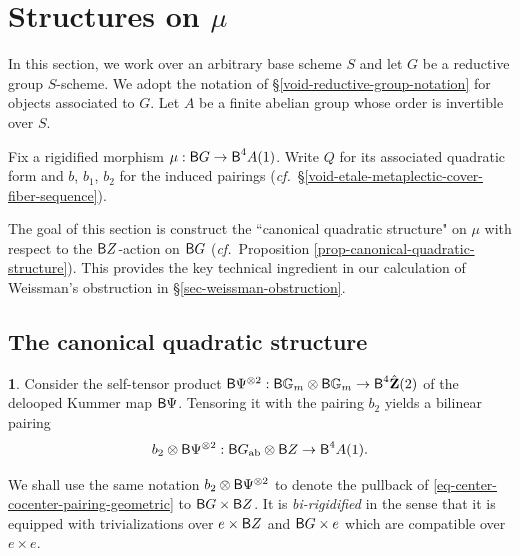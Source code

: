 \documentclass[10pt,english,reqno]{amsart}
\newcommand{\integers}{\mathbf Z}
\newcommand{\deloop}{\textnormal{\textsf{B}}}
\newcommand{\abelian}{\textnormal{ab}}
\theoremstyle{definition}
\numberwithin{equation}{section}
\newtheorem{untitledsubsubsection}[subsubsection]{}
\newenvironment{void}
{\begin{untitledsubsubsection}}
{\end{untitledsubsubsection}}
\begin{document}


\medskip



\section{Structures on $\mu$}

In this section, we work over an arbitrary base scheme $S$ and let $G$ be a reductive group $S$-scheme. We adopt the notation of \S\ref{void-reductive-group-notation} for objects associated to $G$. Let $A$ be a finite abelian group whose order is invertible over $S$.

Fix a rigidified morphism $\mu : \deloop G \rightarrow \deloop^4A(1)$. Write $Q$ for its associated quadratic form and $b$, $b_1$, $b_2$ for the induced pairings (\emph{cf.}~\S\ref{void-etale-metaplectic-cover-fiber-sequence}).

The goal of this section is construct the ``canonical quadratic structure" on $\mu$ with respect to the $\deloop Z$-action on $\deloop G$ (\emph{cf.}~Proposition \ref{prop-canonical-quadratic-structure}). This provides the key technical ingredient in our calculation of Weissman's obstruction in \S\ref{sec-weissman-obstruction}.


\subsection{The canonical quadratic structure}
\label{sec-canonical-quadratic-structure}

\begin{void}
\label{void-center-cocenter-pairing-geometric}
Consider the self-tensor product $\deloop\Psi^{\otimes 2} : \deloop\mathbb G_m \otimes \deloop \mathbb G_m \rightarrow \deloop^4\hat{\integers}(2)$ of the delooped Kummer map $\deloop\Psi$. Tensoring it with the pairing $b_2$ yields a bilinear pairing
\begin{equation}
\label{eq-center-cocenter-pairing-geometric}
b_2\otimes \deloop\Psi^{\otimes 2} : \deloop G_{\abelian} \otimes \deloop Z \rightarrow \deloop^4 A(1).
\end{equation}

We shall use the same notation $b_2\otimes \deloop\Psi^{\otimes 2}$ to denote the pullback of \eqref{eq-center-cocenter-pairing-geometric} to $\deloop G \times \deloop Z$. It is \emph{bi-rigidified} in the sense that it is equipped with trivializations over $e\times \deloop Z$ and $\deloop G \times e$ which are compatible over $e\times e$.
\end{void}
\end{document}
